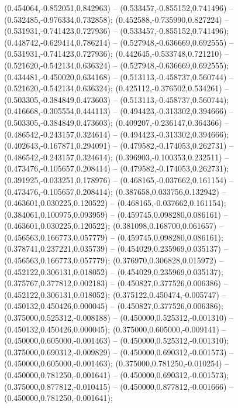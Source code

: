  (0.454064,-0.852051,0.842963) -- (0.533457,-0.855152,0.741496) -- (0.532485,-0.976334,0.732858);
 (0.452588,-0.735990,0.827224) -- (0.531931,-0.741423,0.727936) -- (0.533457,-0.855152,0.741496);
 (0.448742,-0.629414,0.786214) -- (0.527948,-0.636669,0.692555) -- (0.531931,-0.741423,0.727936);
 (0.442645,-0.533748,0.721210) -- (0.521620,-0.542134,0.636324) -- (0.527948,-0.636669,0.692555);
 (0.434481,-0.450020,0.634168) -- (0.513113,-0.458737,0.560744) -- (0.521620,-0.542134,0.636324);
 (0.425112,-0.376502,0.534261) -- (0.503305,-0.384849,0.473603) -- (0.513113,-0.458737,0.560744);
 (0.416668,-0.305554,0.444113) -- (0.494423,-0.313302,0.394666) -- (0.503305,-0.384849,0.473603);
 (0.409207,-0.236147,0.364366) -- (0.486542,-0.243157,0.324614) -- (0.494423,-0.313302,0.394666);
 (0.402643,-0.167871,0.294091) -- (0.479582,-0.174053,0.262731) -- (0.486542,-0.243157,0.324614);
 (0.396903,-0.100353,0.232511) -- (0.473476,-0.105657,0.208414) -- (0.479582,-0.174053,0.262731);
 (0.391925,-0.033251,0.178976) -- (0.468165,-0.037662,0.161154) -- (0.473476,-0.105657,0.208414);
 (0.387658,0.033756,0.132942) -- (0.463601,0.030225,0.120522) -- (0.468165,-0.037662,0.161154);
 (0.384061,0.100975,0.093959) -- (0.459745,0.098280,0.086161) -- (0.463601,0.030225,0.120522);
 (0.381098,0.168700,0.061657) -- (0.456563,0.166773,0.057779) -- (0.459745,0.098280,0.086161);
 (0.378741,0.237221,0.035739) -- (0.454029,0.235969,0.035137) -- (0.456563,0.166773,0.057779);
 (0.376970,0.306828,0.015972) -- (0.452122,0.306131,0.018052) -- (0.454029,0.235969,0.035137);
 (0.375767,0.377812,0.002183) -- (0.450827,0.377526,0.006386) -- (0.452122,0.306131,0.018052);
 (0.375122,0.450474,-0.005747) -- (0.450132,0.450426,0.000045) -- (0.450827,0.377526,0.006386);
 (0.375000,0.525312,-0.008188) -- (0.450000,0.525312,-0.001310) -- (0.450132,0.450426,0.000045);
 (0.375000,0.605000,-0.009141) -- (0.450000,0.605000,-0.001463) -- (0.450000,0.525312,-0.001310);
 (0.375000,0.690312,-0.009829) -- (0.450000,0.690312,-0.001573) -- (0.450000,0.605000,-0.001463);
 (0.375000,0.781250,-0.010254) -- (0.450000,0.781250,-0.001641) -- (0.450000,0.690312,-0.001573);
 (0.375000,0.877812,-0.010415) -- (0.450000,0.877812,-0.001666) -- (0.450000,0.781250,-0.001641);
